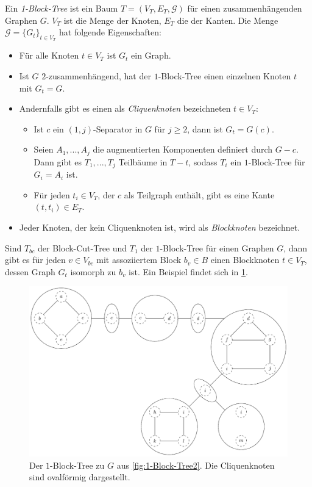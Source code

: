 \begin{definition}
  Ein \emph{1-Block-Tree} ist ein Baum $T = (V_T, E_T, \mathcal{G})$ für einen zusammenhängenden Graphen $G$.
  $V_T$ ist die Menge der Knoten, $E_T$ die der Kanten.
  Die Menge $\mathcal{G} = \{G_t\}_{t \in V_T}$ hat folgende Eigenschaften:
  \begin{itemize}
    \item Für alle Knoten $t \in V_T$ ist $G_t$ ein Graph.
    \item Ist $G$ $2$-zusammenhängend, hat der $1$-Block-Tree einen einzelnen Knoten $t$ mit $G_t = G$.
    \item Andernfalls gibt es einen als \emph{Cliquenknoten} bezeichneten $t \in V_T$:
    \begin{itemize}
      \item Ist $c$ ein $(1, j)$-Separator in $G$ für $j \geq 2$, dann ist $G_t = G(c)$.
      \item Seien $A_1, ..., A_j$ die augmentierten Komponenten definiert durch $G - c$.
            Dann gibt es $T_1, ..., T_j$ Teilbäume in $T - t$, sodass $T_i$ ein $1$-Block-Tree für $G_i = A_i$ ist.
      \item Für jeden $t_i \in V_T$, der $c$ als Teilgraph enthält, gibt es eine Kante $(t, t_i) \in E_T$.
    \end{itemize}
    \item Jeder Knoten, der kein Cliquenknoten ist, wird als \emph{Blockknoten} bezeichnet.
  \end{itemize}
\end{definition}
Sind $T_{bc}$ der Block-Cut-Tree und $T_1$ der $1$-Block-Tree für einen Graphen $G$, dann gibt es für jeden $v \in V_{bc}$ mit assoziiertem Block $b_v \in B$ einen Blockknoten $t \in V_T$, dessen Graph $G_t$ isomorph zu $b_v$ ist.
Ein Beispiel findet sich in \Abb \ref{fig:1-Block-Tree3}.
\begin{figure}[H]
  \centering
  \includegraphics[width=\textwidth,height=\textheight,keepaspectratio]{bilder/1-Block-Tree3.pdf}
  \caption{Der $1$-Block-Tree zu $G$ aus \Abb \ref{fig:1-Block-Tree2}.
           Die Cliquenknoten sind ovalförmig dargestellt.}
  \label{fig:1-Block-Tree3}
\end{figure}



